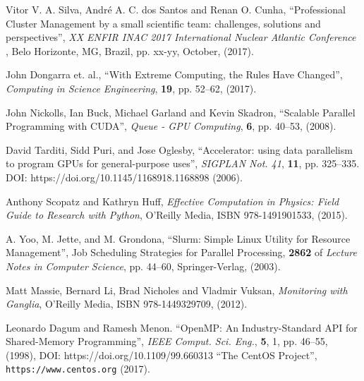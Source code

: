 \documentclass[twoside,a4paper,12pt,english]{inac19}
\begin{document}

\begin{thebibliography}{99} %

 Vitor V. A. Silva, Andr\'{e} A. C. dos Santos and Renan O. Cunha, ``Professional Cluster Management
  by a small scientific team: challenges, solutions and perspectives'', \textit{XX ENFIR INAC 2017 International Nuclear Atlantic Conference }, Belo Horizonte, MG, Brazil, pp. xx-yy, October, (2017). 
  
  
 John Dongarra et. al., ``With Extreme Computing, the Rules Have Changed'', \textit{Computing in Science Engineering}, \textbf{19}, pp. 52--62, (2017).
  
 John Nickolls, Ian Buck, Michael Garland and Kevin Skadron, ``Scalable Parallel Programming with CUDA'', \textit{Queue - GPU Computing}, \textbf{6}, pp. 40--53, (2008).
  
 David Tarditi, Sidd Puri, and Jose Oglesby, ``Accelerator: using data parallelism to program GPUs for general-purpose uses'',  \textit{SIGPLAN Not. 41}, \textbf{11}, pp. 325--335. DOI: https://doi.org/10.1145/1168918.1168898 (2006).

 Anthony Scopatz and Kathryn Huff, \textit{Effective Computation in Physics: Field Guide to Research with Python}, O'Reilly Media, ISBN 978-1491901533, (2015).
  
 A. Yoo, M. Jette, and M. Grondona, ``Slurm: Simple Linux Utility for Resource Management'', Job Scheduling Strategies for Parallel Processing, \textbf{2862} of \textit{Lecture Notes in Computer Science}, pp. 44--60, Springer-Verlag, (2003).
  

 Matt Massie, Bernard Li, Brad Nicholes and Vladmir Vuksan, \textit{Monitoring with Ganglia}, O'Reilly Media, ISBN 978-1449329709, (2012).

   Leonardo Dagum and Ramesh Menon. ``OpenMP: An Industry-Standard API for Shared-Memory Programming'', \textit{IEEE Comput. Sci. Eng.}, \textbf{5}, 1, pp. 46--55, (1998), DOI: https://doi.org/10.1109/99.660313 
 ``The CentOS Project'', \verb#https://www.centos.org# (2017).


\end{thebibliography}
\end{document}
